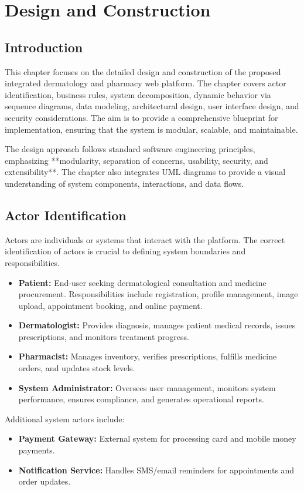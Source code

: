 \documentclass[12pt,a4paper]{report}
\begin{document}
\chapter{Design and Construction}

\section{Introduction}
This chapter focuses on the detailed design and construction of the proposed integrated dermatology and pharmacy web platform. The chapter covers actor identification, business rules, system decomposition, dynamic behavior via sequence diagrams, data modeling, architectural design, user interface design, and security considerations. The aim is to provide a comprehensive blueprint for implementation, ensuring that the system is modular, scalable, and maintainable.

The design approach follows standard software engineering principles, emphasizing **modularity, separation of concerns, usability, security, and extensibility**. The chapter also integrates UML diagrams to provide a visual understanding of system components, interactions, and data flows.

\section{Actor Identification}
Actors are individuals or systems that interact with the platform. The correct identification of actors is crucial to defining system boundaries and responsibilities.

\begin{itemize}
    \item \textbf{Patient:} End-user seeking dermatological consultation and medicine procurement. Responsibilities include registration, profile management, image upload, appointment booking, and online payment.
    \item \textbf{Dermatologist:} Provides diagnosis, manages patient medical records, issues prescriptions, and monitors treatment progress.
    \item \textbf{Pharmacist:} Manages inventory, verifies prescriptions, fulfills medicine orders, and updates stock levels.
    \item \textbf{System Administrator:} Oversees user management, monitors system performance, ensures compliance, and generates operational reports.
\end{itemize}

Additional system actors include:
\begin{itemize}
    \item \textbf{Payment Gateway:} External system for processing card and mobile money payments.
    \item \textbf{Notification Service:} Handles SMS/email reminders for appointments and order updates.
\end{itemize}
\end{document}
